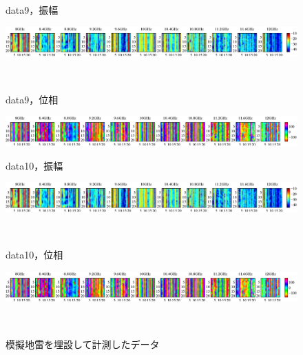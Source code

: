 ﻿\documentclass[12pt,oneside]{jsbook}
\begin{document}
\begin{figure}[hbtp]
 \begin{center}
     \begin{minipage}[c]{0.19\hsize}
      data9，振幅
  \end{minipage}
     \begin{minipage}[c]{0.79\hsize}
\includegraphics[width = \hsize ]{20150204_mine9_raw_a.eps}
  \end{minipage}
\\
     \begin{minipage}[c]{0.19\hsize}
data9，位相
  \end{minipage}
     \begin{minipage}[c]{0.8\hsize}
\includegraphics[width =\hsize ]{20150204_mine9_raw_p.eps}
  \end{minipage}
\end{center}
\end{figure}
\begin{figure}[hbtp]
 \begin{center}
     \begin{minipage}[c]{0.19\hsize}
      data10，振幅
  \end{minipage}
     \begin{minipage}[c]{0.79\hsize}
\includegraphics[width = \hsize ]{20150204_mine10_raw_a.eps}
  \end{minipage}
\\
     \begin{minipage}[c]{0.19\hsize}
data10，位相
  \end{minipage}
     \begin{minipage}[c]{0.8\hsize}
\includegraphics[width =\hsize ]{20150204_mine10_raw_p.eps}
  \end{minipage}
\\
\caption{模擬地雷を埋設して計測したデータ}
\label{mine-raw}
 \end{center}
\end{figure}
\end{document}
